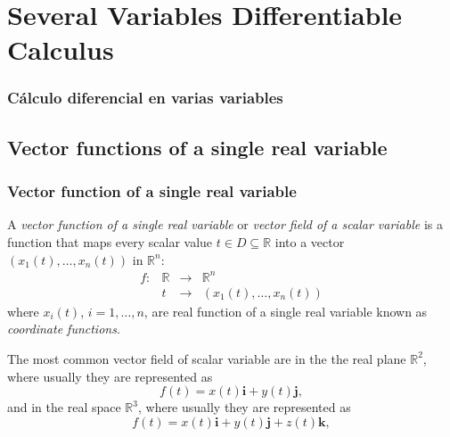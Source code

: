 
\section{Several Variables Differentiable Calculus}
\begin{frame}
\frametitle{Cálculo diferencial en varias variables}
\tableofcontents[sectionstyle=show/hide,hideothersubsections]
\end{frame}


\subsection{Vector functions of a single real variable}

\begin{frame}
\frametitle{Vector function of a single real variable}

\begin{definition}
A \emph{vector function of a single real variable} or \emph{vector field of a scalar variable} is a function that maps every scalar value $t\in D\subseteq \mathbb{R}$ into a vector $(x_1(t),\ldots,x_n(t))$ in $\mathbb{R}^n$:
\[
\begin{array}{rccl}
f: & \mathbb{R} & \longrightarrow & \mathbb{R}^n\\
& t & \longrightarrow & (x_1(t),\ldots, x_n(t))
\end{array}
\] 
where $x_i(t)$, $i=1,\ldots,n$, are real function of a single real variable known as \emph{coordinate functions}.
\end{definition}

The most common vector field of scalar variable are in the the real plane $\mathbb{R}^2$, where usually they are represented as
\[
f(t)=x(t)\mathbf{i}+y(t)\mathbf{j},
\]
and in the real space $\mathbb{R}^3$, where usually they are represented as
\[
f(t)=x(t)\mathbf{i}+y(t)\mathbf{j}+z(t)\mathbf{k},
\]
\end{frame}


